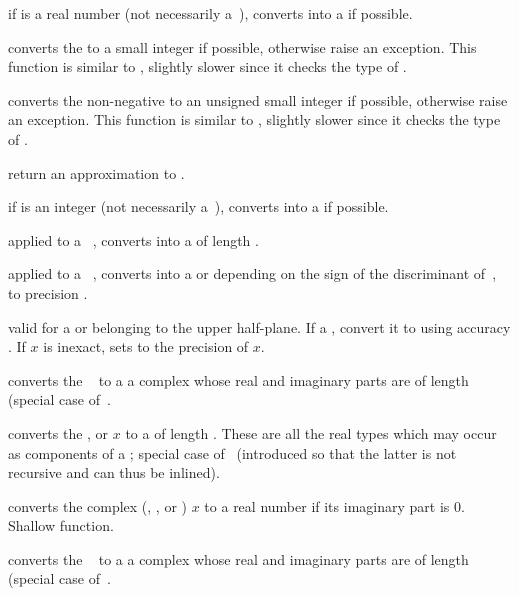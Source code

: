  if  is a real number (not necessarily
a~), converts  into a  if possible.

 converts the   to a small
integer if possible, otherwise raise an exception. This function
is similar to , slightly slower since it checks the type of .

 converts the non-negative   to
an unsigned small integer if possible, otherwise raise an exception. This
function is similar to , slightly slower since it checks the type
of .

 return an approximation to .

 if  is an integer (not necessarily
a~), converts  into a  if possible.

 applied to a ~, converts
 into a  of length .

 applied to a ~, converts
 into a  or  depending on the sign of the
discriminant of~, to precision .

 valid for a 
or  belonging to the upper half-plane. If a , convert it
to  using accuracy . If $x$ is inexact, sets
 to the precision of $x$.

 converts the ~ to a
a complex whose real and imaginary parts are  of length 
(special case of~.

 converts the
,  or  $x$ to a  of length .
These are all the real types which may occur as components of a
; special case of~ (introduced so that the latter is
not recursive and can thus be inlined).

 converts the complex (, ,
 or ) $x$ to a real number if its imaginary part is 0.
Shallow function.

converts the ~ to a
a complex whose real and imaginary parts are  of length 
(special case of~.

